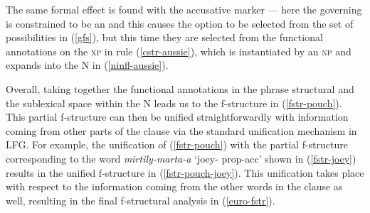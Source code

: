 \documentclass[output=paper,hidelinks]{langscibook}
\begin{document}
The same formal effect is found with the accusative marker --- here the
governing \GF is constrained to be an \OBJ and this
causes the \OBJ option to be selected from the set of possibilities in
(\ref{gfs}), but this time they are selected from the functional annotations on
the \textsc{xp} in rule (\ref{cstr-aussie}), which is instantiated by an \textsc{np} and expands
into the N in (\ref{ninfl-aussie}).  

Overall, taking together the functional annotations in the phrase structural and
the sublexical space within the N  leads us to the f-structure in
(\ref{fstr-pouch}).  This partial f-structure can then be unified
straightforwardly with
information coming from other parts of the clause via the standard unification
mechanism in LFG.   For example, the unification of (\ref{fstr-pouch}) with the partial
f-structure corresponding to the word \textit{mirtily-marta-a} `joey-{\sc
  prop-acc}' shown in (\ref{fstr-joey}) results in the unified
f-structure in (\ref{fstr-pouch-joey}).   This unification takes place with
respect to the information coming from the other words in the clause as well,
 resulting in the final f-structural analysis in (\ref{euro-fstr}).  



\end{document}
